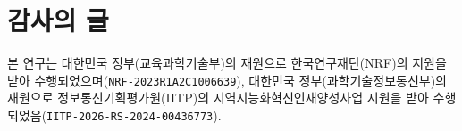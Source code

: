 \documentclass[9pt,twocolumn]{extarticle}
\begin{document}
\noindent\begin{minipage}{\columnwidth}
\section*{감사의 글}
\begingroup
\raggedright
본 연구는 대한민국 정부(교육과학기술부)의 재원으로 한국연구재단(NRF)의 지원을 받아 수행되었으며(\nolinkurl{NRF-2023R1A2C1006639}), 대한민국 정부(과학기술정보통신부)의 재원으로 정보통신기획평가원(IITP)의 지역지능화혁신인재양성사업 지원을 받아 수행되었음(\nolinkurl{IITP-2026-RS-2024-00436773}).
\par
\endgroup
\end{minipage}


\begingroup
\fontsize{8pt}{12pt}\selectfont

\endgroup
\end{document}
